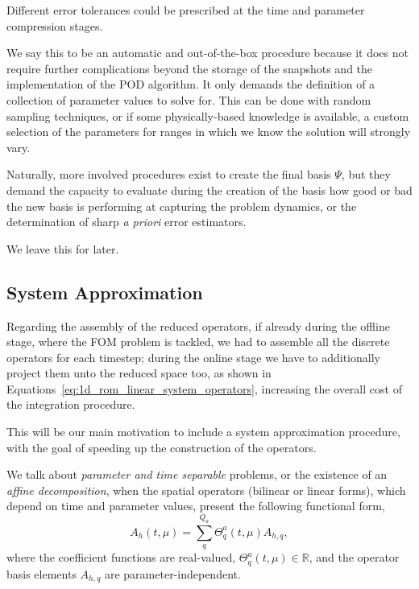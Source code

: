 \documentclass[../main.tex]{subfiles}
\begin{document}
Different error tolerances could be prescribed at the time and parameter compression stages.

We say this to be an automatic and out-of-the-box procedure because it does not require further complications beyond the storage of the snapshots and the implementation of the POD algorithm.
It only demands the definition of a collection of parameter values to solve for.
This can be done with random sampling techniques, or if some physically-based knowledge is available, a custom selection of the parameters for ranges in which we know the solution will strongly vary.

Naturally, more involved procedures exist to create the final basis $\Psi$, but they demand the capacity to evaluate during the creation of the basis how good or bad the new basis is performing at capturing the problem dynamics, or the determination of sharp \emph{a priori} error estimators.

We leave this for later.

\subsection{System Approximation}
\label{sec:1d_rom_heat_equation_system_approximation_deim}
Regarding the assembly of the reduced operators, if already during the offline stage, where the FOM problem is tackled, we had to assemble all the discrete operators for each timestep;
during the online stage we have to additionally project them unto the reduced space too, as shown in Equations~\eqref{eq:1d_rom_linear_system_operators},
increasing the overall cost of the integration procedure.

This will be our main motivation to include a system approximation procedure,
with the goal of speeding up the construction of the operators.

We talk about \emph{parameter and time separable} problems, or the existence of an \emph{affine decomposition},
when the spatial operators (bilinear or linear forms), which depend on time and parameter values, present the following functional form,
\begin{equation}
    \label{eq:1d_rom_heat_equation_separable_form_time_param}
    A_h(t, \mu) = \sum_q^{Q_a} \Theta_q^a(t, \mu) A_{h,q},
\end{equation}
where the coefficient functions are real-valued, \mbox{$\Theta_q^a(t, \mu) \in \mathbb{R}$}, and the operator basis elements $A_{h,q}$ are parameter-independent.
\end{document}
